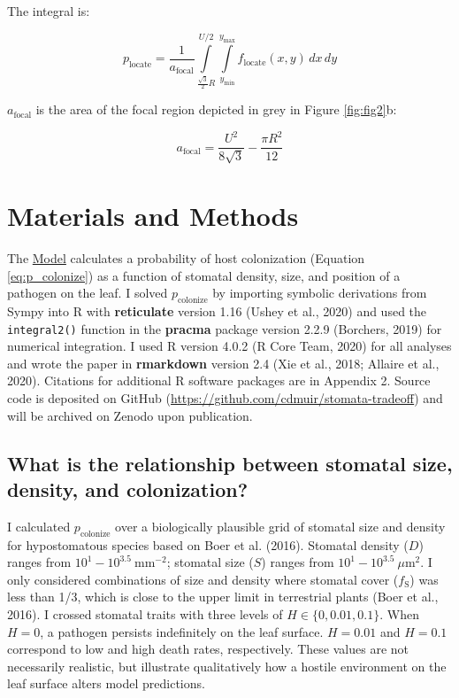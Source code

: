 \documentclass[utf8]{frontiersSCNS}
\newcommand{\fs}{$f_\text{S}$}
\begin{document}
The integral is:

\begin{equation}
  p_\text{locate} = \frac{1}{a_\text{focal}}\int\limits_{\frac{\sqrt{3}}{2} R} ^ {U / 2} \int\limits_{y_\mathrm{min}} ^ {y_\mathrm{max}} f_\text{locate}(x, y) \,dx \,dy
\end{equation}

\(a_\text{focal}\) is the area of the focal region depicted in grey in
Figure \ref{fig:fig2}b:

\[ a_\text{focal} = \frac{U ^ 2}{8 \sqrt{3}} - \frac{\pi R ^ 2}{12} \]

\hypertarget{materials-and-methods}{%
\section*{Materials and Methods}\label{materials-and-methods}}

The \protect\hyperlink{model}{Model} calculates a probability of host
colonization (Equation \ref{eq:p_colonize}) as a function of stomatal
density, size, and position of a pathogen on the leaf. I solved
\(p_\text{colonize}\) by importing symbolic derivations from Sympy into
R with \textbf{reticulate} version 1.16 (Ushey et al., 2020) and used
the \texttt{integral2()} function in the \textbf{pracma} package version
2.2.9 (Borchers, 2019) for numerical integration. I used R version 4.0.2
(R Core Team, 2020) for all analyses and wrote the paper in
\textbf{rmarkdown} version 2.4 (Xie et al., 2018; Allaire et al., 2020).
Citations for additional R software packages are in Appendix 2. Source
code is deposited on GitHub
(\url{https://github.com/cdmuir/stomata-tradeoff}) and will be archived
on Zenodo upon publication.

\hypertarget{what-is-the-relationship-between-stomatal-size-density-and-colonization}{%
\subsection*{What is the relationship between stomatal size, density,
and
colonization?}\label{what-is-the-relationship-between-stomatal-size-density-and-colonization}}

I calculated \(p_\text{colonize}\) over a biologically plausible grid of
stomatal size and density for hypostomatous species based on Boer et al.
(2016). Stomatal density (\(D\)) ranges from
\(10^1 - 10^{3.5}~\text{mm}^{-2}\); stomatal size (\(S\)) ranges from
\(10^1 - 10^{3.5}~\mu\text{m}^2\). I only considered combinations of
size and density where stomatal cover (\fs) was less than 1/3, which is
close to the upper limit in terrestrial plants (Boer et al., 2016). I
crossed stomatal traits with three levels of \(H \in \{0, 0.01, 0.1\}\).
When \(H = 0\), a pathogen persists indefinitely on the leaf surface.
\(H = 0.01\) and \(H = 0.1\) correspond to low and high death rates,
respectively. These values are not necessarily realistic, but illustrate
qualitatively how a hostile environment on the leaf surface alters model
predictions.
\end{document}
